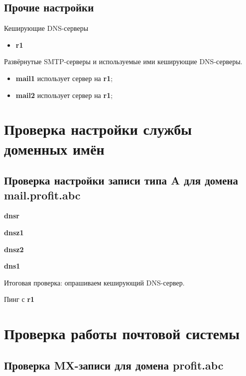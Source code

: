 \documentclass[a4paper,12pt]{article}
\begin{document}
\subsection{Прочие настройки}

Кеширующие DNS-серверы
\begin{itemize}
\item \textbf{r1}
\end{itemize}

Развёрнутые SMTP-серверы и используемые ими кеширующие DNS-серверы.
\begin{itemize}
\item \textbf{mail1} использует сервер на \textbf{r1};
\item \textbf{mail2} использует сервер на \textbf{r1};
\end{itemize}


\clearpage
\section{Проверка настройки службы доменных имён}

\subsection{Проверка настройки записи типа A для домена mail.profit.abc}

\textbf{dnsr}


\clearpage
\textbf{dnsz1}


\clearpage
\textbf{dnsz2}


\clearpage
\textbf{dns1}


\clearpage
Итоговая проверка: опрашиваем кеширующий DNS-сервер.


Пинг с \textbf{r1}


\clearpage
\section{Проверка работы почтовой системы}

\subsection{Проверка MX-записи для домена \textbf{profit.abc}}
\end{document}
